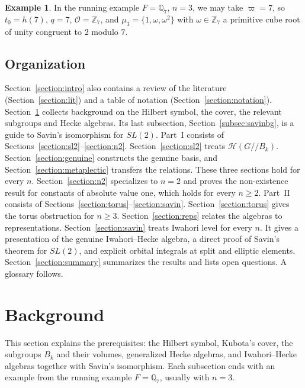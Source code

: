 \documentclass[12pt,letterpaper]{amsart}
\numberwithin{equation}{section}
\theoremstyle{definition}
\newtheorem{example}[theorem]{Example}
\theoremstyle{remark}
\newcommand{\cO}{\mathcal{O}}
\newcommand{\cH}{\mathcal{H}}
\newcommand{\Hlin}{\cH(G/\!/B_k)}
\begin{document}
\begin{example}
In the running example $F=\mathbb{Q}_7$, $n=3$, we may take
$\varpi=7$, so $t_0=h(7)$, $q=7$, $\cO=\mathbb{Z}_7$, and
$\mu_3=\{1,\omega,\omega^2\}$ with $\omega\in\mathbb{Z}_7$ a primitive
cube root of unity congruent to $2$ modulo $7$.
\end{example}

\subsection{Organization}
Section~\ref{section:intro} also contains a review of the literature
(Section~\ref{section:lit}) and a table of notation
(Section~\ref{section:notation}).
Section~\ref{section:background} collects background on the Hilbert
symbol, the cover, the relevant subgroups and Hecke algebras. Its last
subsection, Section~\ref{subsec:savinbg}, is a guide to Savin's
isomorphism for $SL(2)$. Part~I
consists of Sections~\ref{section:sl2}--\ref{section:n2}.
Section~\ref{section:sl2} treats $\Hlin$. Section~\ref{section:genuine}
constructs the genuine basis, and Section~\ref{section:metaplectic}
transfers the relations. These three sections hold for every $n$.
Section~\ref{section:n2} specializes to $n=2$ and proves the
non-existence result for constants of absolute value one, which holds
for every $n\geq 2$. Part~II consists of
Sections~\ref{section:torus}--\ref{section:savin}.
Section~\ref{section:torus} gives the torus obstruction for $n\geq 3$.
Section~\ref{section:reps} relates the algebras to representations.
Section~\ref{section:savin} treats Iwahori level for every $n$. It
gives a presentation of the genuine Iwahori--Hecke algebra, a direct
proof of Savin's theorem for $SL(2)$, and explicit orbital integrals at
split and elliptic elements.
Section~\ref{section:summary} summarizes the results and lists open
questions. A glossary follows.

\section{Background}
\label{section:background}

This section explains the prerequisites: the Hilbert symbol, Kubota's
cover, the subgroups $B_k$ and their volumes, generalized Hecke
algebras, and Iwahori--Hecke algebras together with Savin's
isomorphism. Each subsection ends with an example from the running
example $F=\mathbb{Q}_7$, usually with $n=3$.
\end{document}

